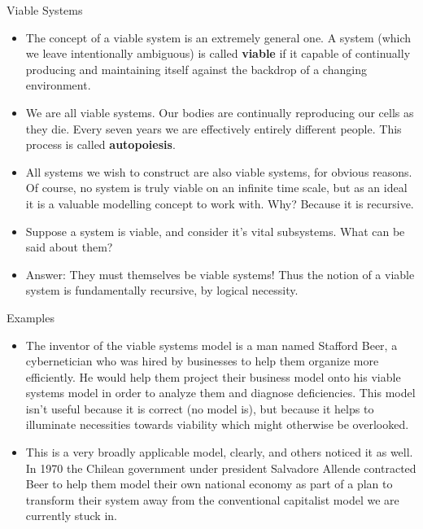 \documentclass{beamer}
\begin{document}
\begin{frame}{Viable Systems}
    \begin{itemize}
        \item The concept of a viable system is an extremely general one. A system (which we leave intentionally ambiguous) is called \textbf{viable} if it capable of continually producing and maintaining itself against the backdrop of a changing environment. \pause 
        \item We are all viable systems. Our bodies are continually reproducing our cells as they die. Every seven years we are effectively entirely different people. This process is called \textbf{autopoiesis}.
        \item All systems we wish to construct are also viable systems, for obvious reasons. Of course, no system is truly viable on an infinite time scale, but as an ideal it is a valuable modelling concept to work with. Why? Because it is recursive.
        \item Suppose a system is viable, and consider it's vital subsystems. What can be said about them? \pause 
        \item Answer: They must themselves be viable systems! Thus the notion of a viable system is fundamentally recursive, by logical necessity. 
    \end{itemize}
\end{frame}

\begin{frame}{Examples}
    \begin{itemize}
        \item The inventor of the viable systems model is a man named Stafford Beer, a cybernetician who was hired by businesses to help them organize more efficiently. He would help them project their business model onto his viable systems model in order to analyze them and diagnose deficiencies. This model isn't useful because it is correct (no model is), but because it helps to illuminate necessities towards viability which might otherwise be overlooked. \par 
        \item This is a very broadly applicable model, clearly, and others noticed it as well. In 1970 the Chilean government under president Salvadore Allende contracted Beer to help them model their own national economy as part of a plan to transform their system away from the conventional capitalist model we are currently stuck in. \par 
    \end{itemize}
\end{frame}
\end{document}
